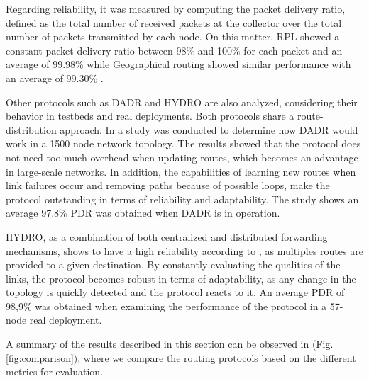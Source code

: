 \documentclass[11pt,draftclsnofoot,onecolumn]{IEEEtran}
\begin{document}
Regarding reliability, it was measured by computing the packet delivery ratio, defined as the total number of received packets at the collector over the total number of packets transmitted by each node. On this matter, RPL showed a constant packet delivery ratio between 98\% and 100\% for each packet and an average of 99.98\% while Geographical routing showed similar performance with an average of 99.30\% \cite{Iyer2011a}.  

Other protocols such as DADR and HYDRO are also analyzed, considering their behavior in testbeds and real deployments. Both protocols share a route-distribution approach. In  \cite{Iwao2010} a study was conducted to determine how DADR would work in a 1500 node network topology. The results showed that the protocol does not need too much overhead when updating routes, which becomes an advantage in large-scale networks. In addition, the capabilities of learning new routes when link failures occur and removing paths because of possible loops, make the protocol outstanding in terms of reliability and adaptability. The study shows an average 97.8\% PDR was obtained when DADR is in operation.

HYDRO, as a combination of both centralized and distributed forwarding mechanisms, shows to have a high reliability according to \cite{Dawson2010}, as multiples routes are provided to a given destination.  By constantly evaluating the qualities of the links, the protocol becomes robust in terms of adaptability, as any change in the topology is quickly detected and the protocol reacts to it. An average PDR of 98,9\% was obtained when examining the performance of the protocol in a 57-node real deployment. 
	
A summary of the results described in this section can be observed in (Fig. \ref{fig:comparison}), where we compare the routing protocols based on the different metrics for evaluation.
\end{document}
